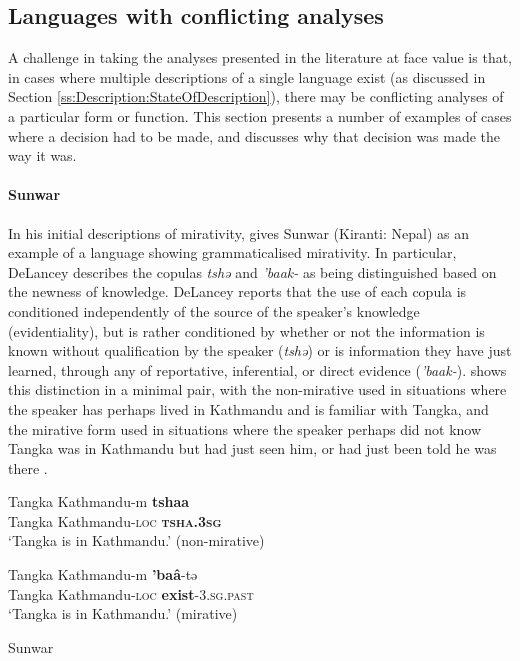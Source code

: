 \subsection{Languages with conflicting analyses}\label{ss:Description:Conflicts}
A challenge in taking the analyses presented in the literature at face value is that, in cases where multiple descriptions of a single language exist (as discussed in Section \ref{ss:Description:StateOfDescription}), there may be conflicting analyses of a particular form or function. This section presents a number of examples of cases where a decision had to be made, and discusses why that decision was made the way it was. 

\paragraph{Sunwar}
In his initial descriptions of mirativity,  gives Sunwar (Kiranti: Nepal) as an example of a language showing grammaticalised mirativity. In particular, DeLancey describes the copulas \textit{tshə} and \textit{'baak-} as being distinguished based on the newness of knowledge. DeLancey reports that the use of each copula is conditioned independently of the source of the speaker's knowledge (evidentiality), but is rather conditioned by whether or not the information is known without qualification by the speaker (\textit{tshə}) or is information they have just learned, through any of reportative, inferential, or direct evidence (\textit{'baak-}).  shows this distinction in a minimal pair, with the non-mirative used in situations where the speaker has perhaps lived in Kathmandu and is familiar with Tangka, and the mirative form used in situations where the speaker perhaps did not know Tangka was in Kathmandu but had just seen him, or had just been told he was there \cite[42]{DeLanceyMirativity1997}.

\begin{exe}
        \ex\label{e:Description:SunwarMirative}
        \begin{xlist}
                \ex 
                \gll Tangka Kathmandu-m \textbf{tshaa} \\
                Tangka Kathmandu-\textsc{loc} \textbf{\textsc{tsha.3sg}} \\
                \glt `Tangka is in Kathmandu.' (non-mirative)

                \ex
                \gll Tangka Kathmandu-m \textbf{'baâ}-tə \\
                Tangka Kathmandu-\textsc{loc} \textbf{exist}-\textsc{3.sg.past} \\
                \glt `Tangka is in Kathmandu.' (mirative)
        \end{xlist}
        Sunwar \cite[Kiranti: Nepal,][41-42]{DeLanceyMirativity1997}
\end{exe}

